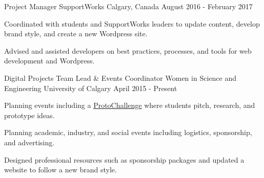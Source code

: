 \begin{cventries}

    
  \cventry
    {Project Manager}
    {SupportWorks}
    {Calgary, Canada}
    {August 2016 - February 2017}
    {
      \begin{cvitems}
        \item {Coordinated with students and SupportWorks leaders to update content, develop brand style, and create a new Wordpress site.}
        \item {Advised and assisted developers on best practices, processes, and tools for web development and Wordpress.}
      \end{cvitems}
    }
  \cventry
    {Digital Projects Team Lead \& Events Coordinator}
    {Women in Science and Engineering}
    {University of Calgary}
    {April 2015 - Present}
    {
      \begin{cvitems}
      	\item {Planning events including a \underline{\href{http://www.protochallenge.strikingly.com}{ProtoChallenge}} where students pitch, research, and prototype ideas.}
        \item {Planning academic, industry, and social events including logistics, sponsorship, and advertising.}
        \item {Designed professional resources such as sponsorship packages and updated a website to follow a new brand style.}
      \end{cvitems}
    }

\end{cventries}
